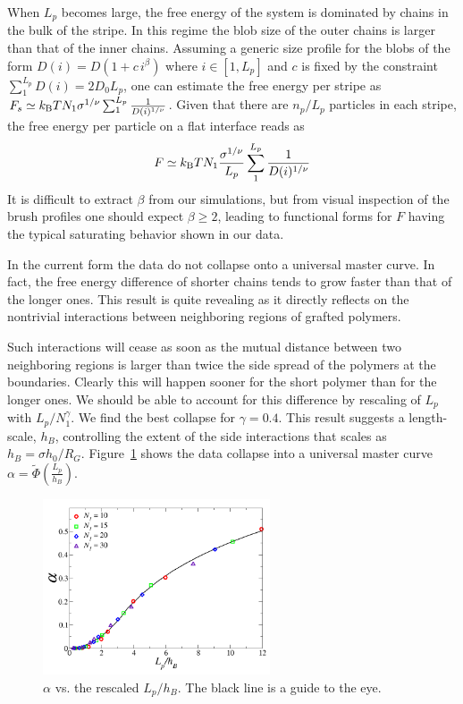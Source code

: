 When $L_p$ becomes large, 
the free energy of the system is dominated by chains 
in the bulk of the  stripe. In this regime the blob size of the outer chains is larger than that of the inner chains.
Assuming a generic size profile for the blobs of the form $D(i)=D(1+ c \,i^{\beta})$ where $i\in [1,L_p]$ and
 $c$ is fixed by the constraint $\sum_1^{L_p} D(i)=2D_0L_p$, 
one can estimate the free energy per stripe as $F_s\simeq k_{\rm B}T N_1 \sigma^{1/\nu} \sum_1^{L_p}  \frac{1}{D(i)^{1/\nu}}$. Given that there are $n_p/L_p$ particles in each stripe, the free energy per particle on a flat interface  reads as
\begin{equation}
F\simeq k_{\rm B}T N_1 \frac{\sigma^{1/\nu}}{L_p} \sum_1^{L_p}  \frac{1}{D(i)^{1/\nu}}
\end{equation}
It is difficult to extract $\beta$ from our simulations, but from visual inspection of the brush profiles 
one should  expect $\beta\geq2$, leading  to functional forms for $F$ having the typical saturating behavior 
shown in our data. 

In the current form the data do not  collapse onto a universal master curve. In fact, the free energy difference of shorter chains tends to grow faster than that of the longer ones. 
This result is quite revealing as it directly reflects on the 
nontrivial interactions between neighboring regions of grafted polymers.

Such interactions will cease as soon as the mutual distance between two neighboring regions is larger than
twice the side spread of the polymers at the boundaries. Clearly this will happen sooner for the 
short polymer than for the longer ones. We should be able to account for this difference by  
rescaling of $L_p$ with  $L_p/N_1^{\gamma}$.
We find the best collapse for $\gamma=0.4$. This result suggests a 
length-scale, $h_B$, controlling the extent of the side interactions  that scales as $h_B=\sigma h_0/R_G$. 
Figure~\ref{FvsLpscaled} shows the data collapse into a universal master curve $\alpha={\tilde \Phi}(\frac{L_p}{h_B})$.

\begin{figure}
	\begin{center}\includegraphics[width=0.6\textwidth]{brush/FvsLpscaled}\end{center}
	\caption[$\alpha$ vs. the rescaled $L_p/h_B$]{$\alpha$ vs. the rescaled $L_p/h_B$.  The black line is a guide to the eye.}\label{FvsLpscaled}
\end{figure}


